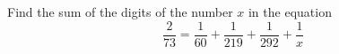 Find the sum of the digits of the number $x$ in the equation \[\dfrac{2}{73}=\dfrac{1}{60}+\dfrac{1}{219}+\dfrac{1}{292}+\dfrac{1}{x}\]
